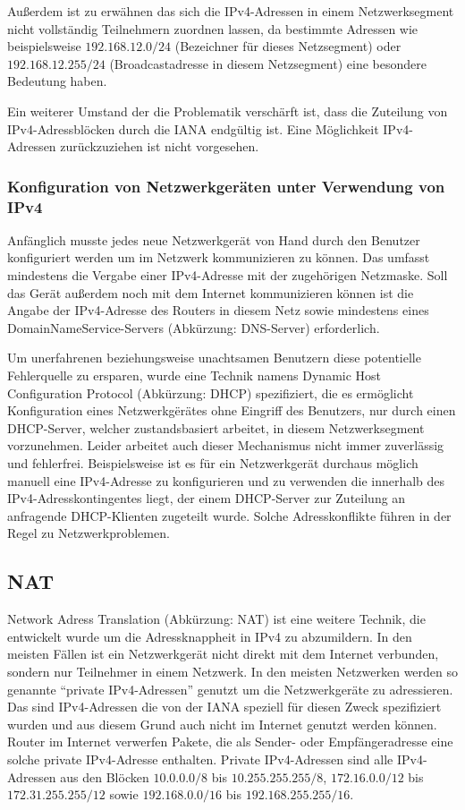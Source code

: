 \documentclass[a4paper,12pt]{scrartcl}
\begin{document}
Au\ss{}erdem ist zu erw\"ahnen das sich die IPv4-Adressen in einem Netzwerksegment nicht vollst\"andig Teilnehmern zuordnen lassen, da bestimmte Adressen wie beispielsweise $192.168.12.0/24$ (Bezeichner f\"ur dieses Netzsegment) oder $192.168.12.255/24$ (Broadcastadresse in diesem Netzsegment) eine besondere Bedeutung haben. 

Ein weiterer Umstand der die Problematik versch\"arft ist, dass die Zuteilung von IPv4-Adressbl\"ocken durch die IANA endg\"ultig ist. Eine M\"oglichkeit IPv4-Adressen zur\"uckzuziehen ist nicht vorgesehen. 


\subsubsection{Konfiguration von Netzwerkger\"aten  unter Verwendung von IPv4}

Anf\"anglich musste jedes neue Netzwerkger\"at von Hand durch den Benutzer konfiguriert werden um im Netzwerk kommunizieren zu k\"onnen. Das umfasst mindestens die Vergabe einer IPv4-Adresse mit der zugeh\"origen Netzmaske. Soll das Ger\"at au\ss{}erdem noch mit dem Internet kommunizieren k\"onnen ist die Angabe der IPv4-Adresse des Routers in diesem Netz sowie mindestens eines DomainNameService-Servers (Abk\"urzung: DNS-Server) erforderlich. 

Um unerfahrenen beziehungsweise unachtsamen Benutzern diese potentielle Fehlerquelle zu ersparen, wurde eine Technik namens Dynamic Host Configuration Protocol (Abk\"urzung: DHCP) \cite[RFC2131]{RFC2131} spezifiziert, die es erm\"oglicht Konfiguration eines Netzwerkg\"er\"ates ohne Eingriff des Benutzers, nur durch einen DHCP-Server, welcher zustandsbasiert arbeitet,  in diesem Netzwerksegment vorzunehmen. Leider arbeitet auch dieser Mechanismus nicht immer zuverl\"assig und fehlerfrei. Beispielsweise ist es f\"ur ein Netzwerkger\"at durchaus m\"oglich manuell eine IPv4-Adresse zu konfigurieren und zu verwenden die innerhalb des IPv4-Adresskontingentes liegt, der einem DHCP-Server zur Zuteilung an anfragende DHCP-Klienten zugeteilt wurde. Solche Adresskonflikte f\"uhren in der Regel zu Netzwerkproblemen.


\subsection{NAT}
Network Adress Translation (Abk\"urzung: NAT) \cite[RFC1631]{RFC1631} ist eine weitere Technik, die entwickelt wurde um die Adressknappheit in IPv4 zu abzumildern. In den meisten F\"allen ist ein Netzwerkger\"at nicht direkt mit dem Internet verbunden, sondern nur Teilnehmer in einem Netzwerk. In den meisten Netzwerken werden so genannte "`private IPv4-Adressen"' genutzt um die Netzwerkger\"ate zu adressieren. Das sind IPv4-Adressen die von der IANA speziell f\"ur diesen Zweck spezifiziert wurden und aus diesem Grund auch nicht im Internet genutzt werden k\"onnen. Router im Internet verwerfen Pakete, die als Sender- oder Empf\"angeradresse eine solche private IPv4-Adresse enthalten. Private IPv4-Adressen sind alle IPv4-Adressen aus den Bl\"ocken $10.0.0.0/8$ bis $10.255.255.255/8$, $172.16.0.0/12$ bis $172.31.255.255/12$ sowie $192.168.0.0/16$ bis $192.168.255.255/16$. 
\end{document}
